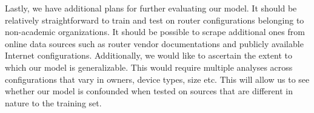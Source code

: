 Lastly, we have additional plans for further evaluating our model. It should be relatively straightforward to train and test on router configurations belonging to non-academic organizations. It should be possible to scrape additional ones from online data sources such as router vendor documentations and publicly available Internet configurations. Additionally, we would like to ascertain the extent to which our model is generalizable. This would require multiple analyses across configurations that vary in owners, device types, size etc. This will allow us to see whether our model is confounded when tested on sources that are different in nature to the training set.